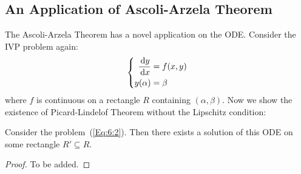 \subsection{An Application of Ascoli-Arzela Theorem}
The Ascoli-Arzela Theorem has a novel application on the ODE. Consider the IVP problem again:
\begin{equation}\label{Eq:6:2}
\left\{
\begin{aligned}
\frac{\diff y}{\diff x}&=f(x,y)\\
y(\alpha)&=\beta
\end{aligned}
\right.
\end{equation}
where $f$ is continuous on a rectangle $R$ containing $(\alpha,\beta)$.
Now we show the existence of Picard-Lindelof Theorem without the Lipschitz condition:
\begin{theorem}
Consider the problem~(\ref{Eq:6:2}).
Then there exists a solution of this ODE on some rectangle $R'\subseteq R$.
\end{theorem}
\begin{proof}
To be added.
\end{proof}
%
%
%
%
%
